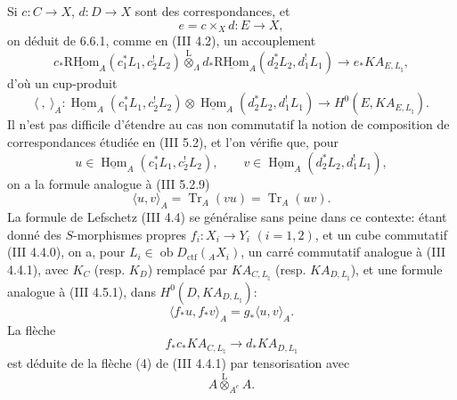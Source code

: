 \documentclass[11pt]{article}
\DeclareMathOperator{\Hom}{Hom}
\providecommand{\RHom}{\mathrm{RHom}}
\providecommand{\uRHom}{\underline{\RHom}}
\providecommand{\uHom}{\underline{\Hom}}
\providecommand{\Tr}{\operatorname{Tr}}
\providecommand{\Tr}{\operatorname{Tr}}
\providecommand{\lten}{\overset{\mathrm L}{\otimes}}
\providecommand{\Ob}{\operatorname{ob}}
\providecommand{\Tr}{\operatorname{Tr}}
\providecommand{\RHom}{\mathrm{RHom}}
\providecommand{\Hom}{\operatorname{Hom}}
\providecommand{\lten}{\overset{\mathrm L}{\otimes}}
\providecommand{\RHom}{\mathrm R\mathcal{H}om}
\providecommand{\lten}{\overset{\mathrm L}{\otimes}}
\providecommand{\Ob}{\operatorname{ob}}
\providecommand{\Tr}{\operatorname{Tr}}
\providecommand{\lten}{\overset{\mathrm L}{\otimes}}
\providecommand{\lten}{\overset{\mathrm L}{\otimes}}
\providecommand{\Ob}{\operatorname{Ob}}
\providecommand{\lten}{\overset{\mathrm L}{\otimes}}
\providecommand{\RHom}{\mathrm{RHom}}
\providecommand{\Hom}{\operatorname{Hom}}
\providecommand{\Tr}{\operatorname{Tr}}
\providecommand{\Ob}{\operatorname{ob}}
\providecommand{\Ob}{\operatorname{Ob}}
\providecommand{\lten}{\overset{\mathrm L}{\otimes}}
\begin{document}
Si $c:C\to X$, $d:D\to X$ sont des correspondances, et
\[
e=c\times_Xd:E\to X,
\]
on déduit de 6.6.1, comme en (III 4.2), un accouplement
\begin{equation}
c_*\uRHom_A(c_1^*L_1,c_2^!L_2)
\lten_{\Lambda}
d_*\uRHom_A(d_2^*L_2,d_1^!L_1)
\longrightarrow
e_*KA_{E,L_{\natural}},
\tag{6.6.2}
\end{equation}
d'où un cup-produit
\begin{equation}
\langle\ ,\ \rangle_A:
\uHom_A(c_1^*L_1,c_2^!L_2)\otimes
\uHom_A(d_2^*L_2,d_1^!L_1)
\longrightarrow
H^0(E,KA_{E,L_{\natural}}).
\tag{6.6.3}
\end{equation}
Il n'est pas difficile d'étendre au cas non commutatif la notion de composition de correspondances étudiée en (III 5.2), et l'on vérifie que, pour
\[
u\in\uHom_A(c_1^*L_1,c_2^!L_2),\qquad
v\in\uHom_A(d_2^*L_2,d_1^!L_1),
\]
on a la formule analogue à (III 5.2.9)
\begin{equation}
\langle u,v\rangle_A=\Tr_A(vu)=\Tr_A(uv).
\tag{6.6.4}
\end{equation}
La formule de Lefschetz (III 4.4) se généralise sans peine dans ce contexte: étant donné des $S$-morphismes propres $f_i:X_i\to Y_i$ $(i=1,2)$, et un cube commutatif (III 4.4.0), on a, pour $L_i\in\Ob D_{\mathrm{ctf}}({}_AX_i)$, un carré commutatif analogue à (III 4.4.1), avec $K_C$ (resp. $K_D$) remplacé par $KA_{C,L_{\natural}}$ (resp. $KA_{D,L_{\natural}}$), et une formule analogue à (III 4.5.1), dans $H^0(D,KA_{D,L_{\natural}})$:
\begin{equation}
\langle f_*u,f_*v\rangle_A=g_*\langle u,v\rangle_A.
\tag{6.6.5}
\end{equation}
La flèche
\[
f_*c_*KA_{C,L_{\natural}}\longrightarrow d_*KA_{D,L_{\natural}}
\]
est déduite de la flèche (4) de (III 4.4.1) par tensorisation avec
\[
A\lten_{A^e}A .
\]
\end{document}

